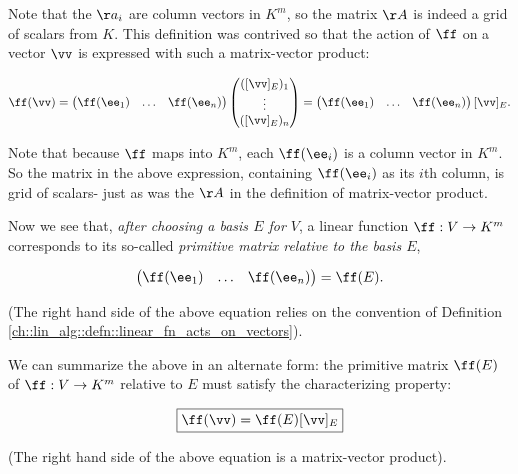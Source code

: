 \begin{deriv}
    Note that the $\aa_i$ are column vectors in $K^m$, so the matrix $\AA$ is indeed a grid of scalars from $K$. This definition was contrived so that the action of $\ff$ on a vector $\vv$ is expressed with such a matrix-vector product:
    
    \begin{align*}
        \ff(\vv) = \begin{pmatrix} \ff(\ee_1) & \hdots & \ff(\ee_n) \end{pmatrix} \begin{pmatrix} ([\vv]_E)_1 \\ \vdots \\ ([\vv]_E)_n \end{pmatrix}
        = \begin{pmatrix} \ff(\ee_1) & \hdots & \ff(\ee_n) \end{pmatrix} [\vv]_E.
    \end{align*}
    
    Note that because $\ff$ maps into $K^m$, each $\ff(\ee_i)$ is a column vector in $K^m$. So the matrix in the above expression, containing $\ff(\ee_i)$ as its $i$th column, is grid of scalars- just as was the $\AA$ in the definition of matrix-vector product.
    
    Now we see that, \textit{after choosing a basis $E$ for $V$}, a linear function $\ff:V \rightarrow K^m$ corresponds to its so-called \textit{primitive matrix relative to the basis $E$},
    
    \begin{align*}
        \begin{pmatrix} 
            \ff(\ee_1) & \hdots & \ff(\ee_n)
        \end{pmatrix}
        =
        \ff(E).
    \end{align*}
    
    (The right hand side of the above equation relies on the convention of Definition \ref{ch::lin_alg::defn::linear_fn_acts_on_vectors}).
    
     We can summarize the above in an alternate form: the primitive matrix $\ff(E)$ of $\ff:V \rightarrow K^m$ relative to $E$ must satisfy the characterizing property:
    
    \begin{align*}
        \boxed{\ff(\vv) = \ff(E) [\vv]_E}
    \end{align*}
    
    (The right hand side of the above equation is a matrix-vector product).
\end{deriv}

